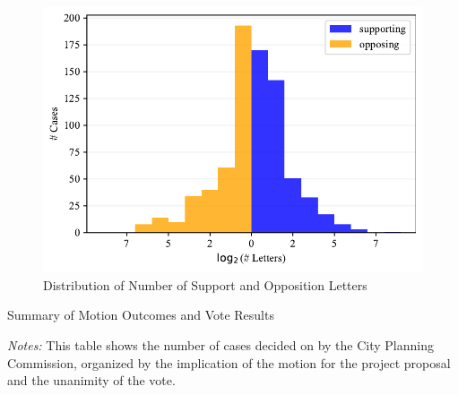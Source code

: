 \documentclass[12pt,english,hyperfootnotes=false,hidelinks]{article}
\begin{document}
\pagebreak

\begin{figure}[H]
\caption{Distribution of Number of Support and Opposition Letters} \label{fig_support_oppose}
\vspace{-0.5cm}
\begin{center}
\includegraphics[width=\textwidth]{figures/fig_support_oppose.pdf}
\end{center}
\end{figure}

\pagebreak


\begin{table}[H]
\caption{Summary of Motion Outcomes and Vote Results}
\vspace{0.2cm}
\label{tab_result_unanimity}
\begin{adjustbox}{max width=\textwidth}
\begin{threeparttable}

\begin{tablenotes}

\item {\textit{Notes: } This table shows the number of cases decided on by the City Planning Commission, organized by the implication of the motion for the project proposal and the unanimity of the vote.}
\end{tablenotes}
\end{threeparttable}
\end{adjustbox}
\end{table}

\pagebreak
\end{document}
